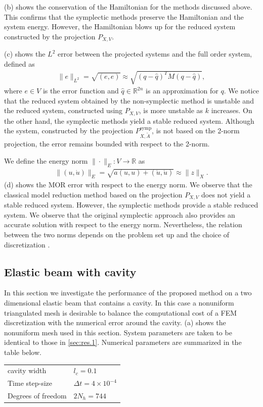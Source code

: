 (b) shows the conservation of the Hamiltonian for the methods discussed above. This confirms that the symplectic methods preserve the Hamiltonian and the system energy. However, the Hamiltonian blows up for the reduced system constructed by the projection $P_{X,V}$.

(c) shows the $L^2$ error between the projected systems and the full order system, defined as
\begin{eqnarray}
	\| e \|_{L^2} = \sqrt{(e,e)} \approx \sqrt{ (q - \hat q)^T M (q-\hat q) },
\end{eqnarray}
where $e\in V$ is the error function and $\hat q \in \mathbb R^{2n}$ is an approximation for $q$. We notice that the reduced system obtained by the non-symplectic method is unstable and the reduced system, constructed using $P_{X,V}$, is more unstable as $k$ increases. On the other hand, the symplectic methods yield a stable reduced system. Although the system, constructed by the projection $P^{\text{symp}}_{X,\tilde A}$, is not based on the 2-norm projection, the error remains bounded with respect to the 2-norm. 

We define the energy norm $\| \cdot \|_E : V \to \mathbb R$ as
\begin{eqnarray}
	\| (u,\dot u) \|_E = \sqrt{ a(u,u) + (\dot u , \dot u) } \approx \| z \|_X.
\end{eqnarray}
(d) shows the MOR error with respect to the energy norm. We observe that the classical model reduction method based on the projection $P_{X,V}$ does not yield a stable reduced system. However, the symplectic methods provide a stable reduced system. We observe that the original symplectic approach also provides an accurate solution with respect to the energy norm. Nevertheless, the relation between the two norms depends on the problem set up and the choice of discretization \cite{DEPARIS20094359}.

\subsection{Elastic beam with cavity}  \label{sec:res.1.1}
In this section we investigate the performance of the proposed method on a two dimensional elastic beam that contains a cavity. In this case a nonuniform triangulated mesh is desirable to balance the computational cost of a FEM discretization with the numerical error around the cavity. (a) shows the nonuniform mesh used in this section.
System parameters are taken to be identical to those in \cref{sec:res.1}. Numerical parameters are summarized in the table below.
\vspace{0.5cm}
\begin{center}
\begin{tabular}{|l|l|}
\hline
cavity width & $l_c = 0.1$ \\
Time step-size & $\Delta t = 4\times 10^{-4}$ \\
Degrees of freedom & $2N_{h} = 744$ \\
\hline
\end{tabular}
\end{center}
\vspace{0.5cm}


